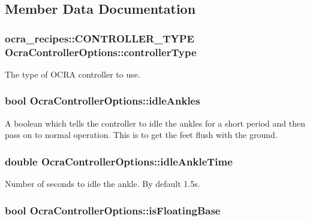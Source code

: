 \subsection{\-Member \-Data \-Documentation}
\hypertarget{classOcraControllerOptions_aa533fe11c53b7fb17105f1edf48e1c0d}{
\subsubsection[{controller\-Type}]{\setlength{\rightskip}{0pt plus 5cm}ocra\-\_\-recipes\-::\-C\-O\-N\-T\-R\-O\-L\-L\-E\-R\-\_\-\-T\-Y\-P\-E {\bf \-Ocra\-Controller\-Options\-::controller\-Type}}}\label{classOcraControllerOptions_aa533fe11c53b7fb17105f1edf48e1c0d}
\-The type of \-O\-C\-R\-A controller to use. \hypertarget{classOcraControllerOptions_a34c0a162302f4f2c462d9ce4818292d5}{
\subsubsection[{idle\-Ankles}]{\setlength{\rightskip}{0pt plus 5cm}bool {\bf \-Ocra\-Controller\-Options\-::idle\-Ankles}}}\label{classOcraControllerOptions_a34c0a162302f4f2c462d9ce4818292d5}
\-A boolean which tells the controller to idle the ankles for a short period and then pass on to normal operation. \-This is to get the feet flush with the ground. \hypertarget{classOcraControllerOptions_af09053d38fbafe448a35804ea86d27aa}{
\subsubsection[{idle\-Ankle\-Time}]{\setlength{\rightskip}{0pt plus 5cm}double {\bf \-Ocra\-Controller\-Options\-::idle\-Ankle\-Time}}}\label{classOcraControllerOptions_af09053d38fbafe448a35804ea86d27aa}
\-Number of seconds to idle the ankle. \-By default 1.\-5s. \hypertarget{classOcraControllerOptions_a1edf322553d88c1ac2bf8947e9d942d7}{
\subsubsection[{is\-Floating\-Base}]{\setlength{\rightskip}{0pt plus 5cm}bool {\bf \-Ocra\-Controller\-Options\-::is\-Floating\-Base}}}\label{classOcraControllerOptions_a1edf322553d88c1ac2bf8947e9d942d7}
